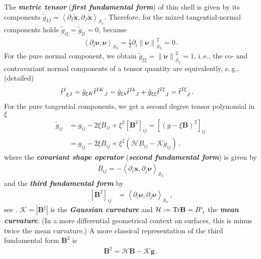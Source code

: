 \documentclass[a4paper,11pt]{scrartcl}
\newcommand{\surf}{\mathcal{S}}
\newcommand{\surfh}{\surf_{h}}
\newcommand{\Tr}{\text{Tr}}
\newcommand{\xb}{\mathbf{x}}
\newcommand{\txb}{\tilde{\xb}}
\newcommand{\nub}{\bm{\nu}}
\newcommand{\gb}{\mathbf{g}}
\newcommand{\tg}{\tilde{g}}
\newcommand{\Bb}{\mathbf{B}}
\newcommand{\ttt}{\tilde{t}}
\newcommand{\meanc}{\mathcal{H}}
\newcommand{\gaussc}{\mathcal{K}}
\newcommand{\formComma}{\,\text{,}}
\newcommand{\formPeriod}{\,\text{.}}
\newcommand{\ie}{i.\,e.}%
\newcommand{\eg}{e.\,g.}
\newcommand{\newterm}[1]{\textbf{\textit{#1}}}
\begin{document}
The \newterm{metric tensor} (\newterm{first fundamental form}) of thin shell is given by its components \( \tg_{IJ} = \left\langle \partial_{I}\txb , \partial_{J}\txb \right\rangle_{\surfh} \).
Therefore, for the mixed tangential-normal components holds \( \tg_{i\xi} = \tg_{\xi i} = 0 \), 
because 
\begin{align}
 \left\langle \partial_{i}\nub , \nub \right\rangle_{\surfh} = \frac{1}{2}\partial_{i}\left\| \nub \right\|^{2}_{\surfh} = 0 \formPeriod
\end{align}
For the pure normal component, we obtain \( \tg_{\xi\xi} = \left\| \nub \right\|^{2}_{\surfh} = 1 \),
\ie, the co- and contravariant normal components of a tensor quantity are equivalently,
\eg, (detailed)
\begin{align}
 \tensor{\ttt}{^{I}_{\xi J}} &= \tg_{\xi K} \tensor{\ttt}{^{IK}_{J}} 
                          = \tg_{\xi k} \tensor{\ttt}{^{Ik}_{J}} + \tg_{\xi \xi} \tensor{\ttt}{^{I\xi}_{J}}
                          = \tensor{\ttt}{^{I\xi}_{J}} \formPeriod
\end{align}
For the pure tangential components, we get a second degree tensor polynomial in \( \xi \)
\begin{align}
  \tg_{ij} &= g_{ij} - 2\xi B_{ij} + \xi^{2}\left[ \Bb^{2} \right]_{ij}
            = \left[ \left( g - \xi\Bb \right)^{2} \right]_{ij}\\
           &= g_{ij} - 2\xi B_{ij} + \xi^{2}\left( \meanc B_{ij} - \gaussc g_{ij} \right) \formPeriod
\end{align}
where the \newterm{covariant shape operator} (\newterm{second fundamental form}) is given by 
\begin{align}
 B_{ij} = -\left\langle \partial_{i}\xb , \partial_{j}\nub  \right\rangle_{\surfh} 
\end{align}
and the \newterm{third fundamental form} by
\begin{align}
 \left[ \Bb^{2} \right]_{ij} &= \left\langle \partial_{i}\nub , \partial_{j}\nub  \right\rangle_{\surfh}\formComma
\end{align}
see \cite{HartmanWintner1953}.
\( \gaussc = \left| \Bb^{\sharp} \right| \) is the \newterm{Gaussian curvature} and \( \meanc := \Tr\Bb = \tensor{B}{^{i}_{i}} \) the \newterm{mean curvature}.
(In a more differential geometrical context on surfaces, this is minus twice the mean curvature.)
A more classical representation of the third fundamental form \( \Bb^{2} \) is
\begin{align}\label{eq:shapesquare}
  \Bb^{2} = \meanc\Bb - \gaussc\gb\formPeriod
\end{align}
\end{document}
